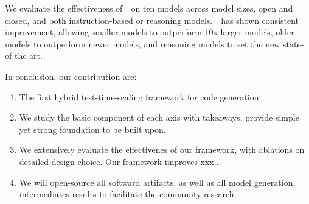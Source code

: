 We evaluate the effectiveness of~\frameworkname~on ten models across model sizes, open and closed, and both instruction-based or reasoning models.~\frameworkname~has shown consistent improvement, allowing smaller models to outperform 10x larger models, older models to outperform newer models, and reasoning models to set the new state-of-the-art.

In conclusion, our contribution are:
\begin{enumerate}
    \item The first hybrid test-time-scaling framework for code generation.
    \item We study the basic component of each axis with takeaways, provide simple yet strong foundation to be built upon.
    \item We extensively evaluate the effectivenes of our framework, with ablations on detailed design choice. Our framework improves xxx...
    \item We will open-source all softward artifacts, as well as all model generation, intermediates results to facilitate the community research.
\end{enumerate}

~

